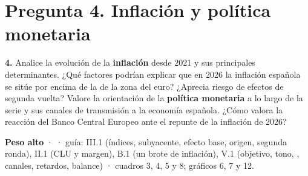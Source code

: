 \clearpage
\section*{Pregunta 4. Inflación y política monetaria}

\begin{enunciado}
\textbf{4.} Analice la evolución de la \textbf{inflación} desde 2021 y sus principales determinantes. ¿Qué factores podrían explicar que en 2026 la inflación española se sitúe por encima de la de la zona del euro? ¿Aprecia riesgo de efectos de segunda vuelta? Valore la orientación de la \textbf{política monetaria} a lo largo de la serie y sus canales de transmisión a la economía española. ¿Cómo valora la reacción del Banco Central Europeo ante el repunte de la inflación de 2026?

\smallskip
\textbf{Peso alto} ·  · guía: III.1 (índices, subyacente, efecto base, origen, segunda ronda), II.1 (CLU y margen), B.1 (un brote de inflación), V.1 (objetivo, tono, , canales, retardos, balance) · cuadros 3, 4, 5 y 8; gráficos 6, 7 y 12.
\end{enunciado}

